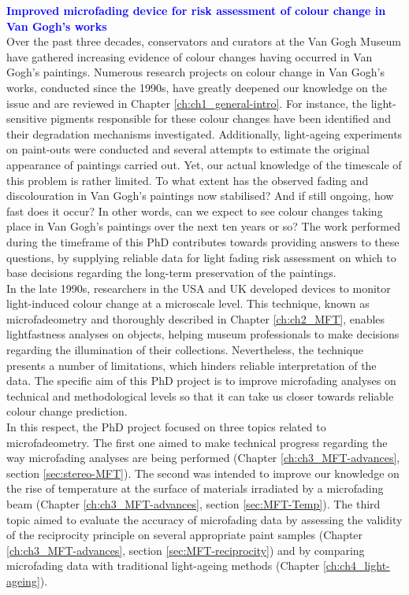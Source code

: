 

\textbf{\textcolor{blue}{Improved microfading device for risk assessment of colour change in Van Gogh's works}}\\

Over the past three decades, conservators and curators at the Van Gogh Museum have gathered increasing evidence of colour changes having occurred in Van Gogh’s paintings. Numerous research projects on colour change in Van Gogh’s works, conducted since the 1990s, have greatly deepened our knowledge on the issue and are reviewed in Chapter \ref{ch:ch1_general-intro}. For instance, the light-sensitive pigments responsible for these colour changes have been identified and their degradation mechanisms investigated. Additionally, light-ageing experiments on paint-outs were conducted and several attempts to estimate the original appearance of paintings carried out. Yet, our actual knowledge of the timescale of this problem is rather limited. To what extent has the observed fading and discolouration in Van Gogh’s paintings now stabilised? And if still ongoing, how fast does it occur? In other words, can we expect to see colour changes taking place in Van Gogh’s paintings over the next ten years or so? The work performed during the timeframe of this PhD contributes towards providing answers to these questions, by supplying reliable data for light fading risk assessment on which to base decisions regarding the long-term preservation of the paintings. \\

In the late 1990s, researchers in the \gls{USA} and \gls{UK} developed devices to monitor light-induced colour change at a microscale level. This technique, known as microfadeometry and thoroughly described in Chapter \ref{ch:ch2_MFT}, enables lightfastness analyses on objects, helping museum professionals to make decisions regarding the illumination of their collections. Nevertheless, the technique presents a number of limitations, which hinders reliable interpretation of the data. The specific aim of this PhD project is to improve microfading analyses on technical and methodological levels so that it can take us closer towards reliable colour change prediction. \\ 

In this respect, the PhD project focused on three topics related to microfadeometry. The first one aimed to make technical progress regarding the way microfading analyses are being performed (Chapter \ref{ch:ch3_MFT-advances}, section \ref{sec:stereo-MFT}). The second was intended to improve our knowledge on the rise of temperature at the surface of materials irradiated by a microfading beam (Chapter \ref{ch:ch3_MFT-advances}, section \ref{sec:MFT-Temp}). The third topic aimed to evaluate the accuracy of microfading data by assessing the validity of the reciprocity principle on several appropriate paint samples (Chapter \ref{ch:ch3_MFT-advances}, section \ref{sec:MFT-reciprocity}) and by comparing microfading data with traditional light-ageing methods (Chapter \ref{ch:ch4_light-ageing}). \\


